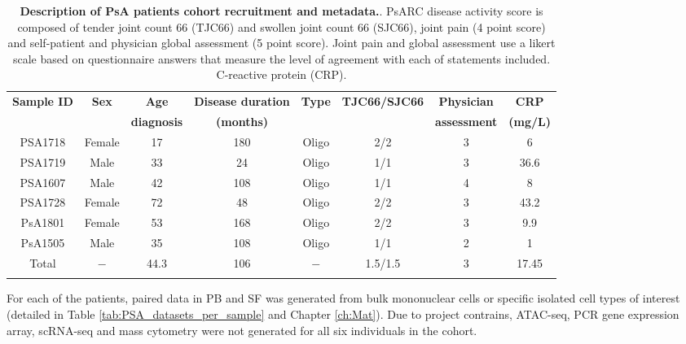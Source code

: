 %
\begin{landscape}
\begin{center}
\begin{longtable}[ht]{c c c c c c c c}
\caption[Description of PsA patients cohort recruitment and metadata.]{\textbf{Description of PsA patients cohort recruitment and metadata.}. PsARC disease activity score is composed of tender joint count 66 (TJC66) and swollen joint count 66 (SJC66), joint pain (4 point score) and self-patient and physician global assessment (5 point score). Joint pain and global assessment use a likert scale based on questionnaire answers that measure the level of agreement with each of statements included. C-reactive protein (CRP).}
\label{tab:PSA_cohort_metadata} \\
\toprule
\textbf{ Sample ID} & \textbf{Sex} & \textbf{Age} & \textbf{Disease duration} & \textbf{Type} &\textbf{TJC66/SJC66}  & \textbf{Physician } & \textbf{CRP} \\
& & \textbf{diagnosis} & \textbf{(months)} & &  & \textbf{assessment} & \textbf{(mg/L)} \\
\midrule
\midrule
PSA1718 & Female & 17 & 180 & Oligo  & 2/2 & 3 & 6 \\
PSA1719	& Male &	33 & 24	 & Oligo &	1/1 &	3 & 36.6 \\           
PSA1607 &	Male & 42 & 108 &	Oligo &	1/1	& 4 & 8 \\
PSA1728	& Female & 72	& 48 & Oligo & 2/2 & 3 & 43.2 \\
PsA1801	& Female & 53 & 168 & Oligo & 2/2 &	3 & 9.9 \\
PsA1505 & Male & 35 &	108 & Oligo & 1/1 & 2 & 1 \\	
\midrule
Total		& $-$	&	44.3 & 106 & $-$ & 1.5/1.5 & 3 & 17.45 \\																			
\bottomrule
\medskip
\end{longtable}
\end{center}
\end{landscape}


For each of the patients, paired data in PB and SF was generated from bulk mononuclear cells or specific isolated cell types of interest (detailed in Table \ref{tab:PSA_datasets_per_sample} and Chapter \ref{ch:Mat}). Due to project contrains, ATAC-seq, PCR gene expression array, scRNA-seq and mass cytometry were not generated for all six individuals in the cohort. 

